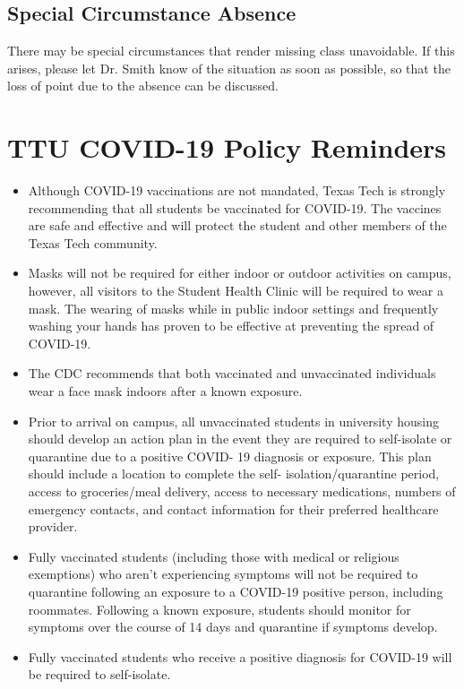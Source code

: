 \documentclass[12pt, notitlepage]{article}   	%
\begin{document}
{\subsection{Special Circumstance Absence}
There may be special circumstances that render missing class unavoidable.
If this arises, please let Dr. Smith know of the situation as soon as possible,
so that the loss of point due to the absence can be discussed.

\section{TTU COVID-19 Policy Reminders}
\begin{itemize}
	\item{Although COVID-19 vaccinations are not mandated, Texas Tech is strongly 
	recommending that all students be vaccinated for COVID-19. The vaccines are safe 
	and effective and will protect the student and other members of the Texas Tech community.}
	\item{Masks will not be required for either indoor or outdoor activities on campus, 
	however, all visitors to the Student Health Clinic will be required to wear a mask. 
	The wearing of masks while in public indoor settings and frequently washing your 
	hands has proven to be effective at preventing the spread of COVID-19.}
	\item{The CDC recommends that both vaccinated and unvaccinated individuals 
	wear a face mask indoors after a known exposure.}
	\item{Prior to arrival on campus, all unvaccinated students in university housing 
	should develop an action plan in the event they are required to self-isolate or 
	quarantine due to a positive COVID- 19 diagnosis or exposure. This plan should 
	include a location to complete the self- isolation/quarantine period, access to 
	groceries/meal delivery, access to necessary medications, numbers of emergency 
	contacts, and contact information for their preferred healthcare provider.}
	\item{Fully vaccinated students (including those with medical or religious exemptions) 
	who aren’t experiencing symptoms will not be required to quarantine following an 
	exposure to a COVID-19 positive person, including roommates. Following a known exposure, 
	students should monitor for symptoms over the course of 14 days and quarantine if symptoms develop.}
	\item{Fully vaccinated students who receive a positive diagnosis for COVID-19 will be required to self-isolate. 
}
\end{itemize}}
\end{document}
